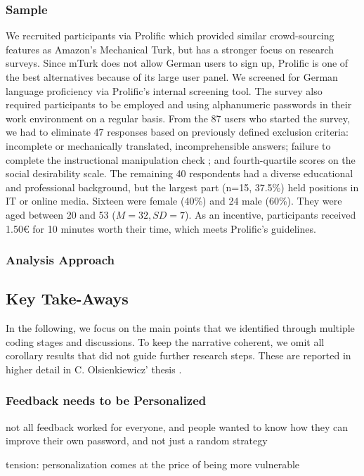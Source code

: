 \subsubsection{Sample}
We recruited participants via Prolific  which provided similar crowd-sourcing features as Amazon's Mechanical Turk, but has a stronger focus on research surveys. Since \gls{mTurk} does not allow German users to sign up, Prolific is one of the best alternatives because of its large user panel. We screened for German language proficiency via Prolific's internal screening tool. The survey also required participants to be employed and using alphanumeric passwords in their work environment on a regular basis. 
From the 87 users who started the survey, we had to eliminate 47 responses based on previously defined exclusion criteria: incomplete or mechanically translated, incomprehensible answers; failure to complete the instructional manipulation check \cite{Oppenheimer2009InstructionalManipulationChecks}; and fourth-quartile scores on the social desirability scale. The remaining 40 respondents had a diverse educational and professional background, but the largest part (n=15, 37.5\%) held positions in IT or online media. Sixteen were female (40\%) and 24 male (60\%). They were aged between 20 and 53 ($M=32, SD=7$). As an incentive, participants received 1.50€ for 10 minutes worth their time, which meets Prolific's guidelines. 

\subsubsection{Analysis Approach}
\subsection{Key Take-Aways}
In the following, we focus on the main points that we identified through multiple coding stages and discussions. To keep the narrative coherent, we omit all corollary results that did not guide further research steps. These are reported in higher detail in C. Olsienkiewicz' thesis \cite{Olsienkiewicz2016BAThesis}. 
\subsubsection{Feedback needs to be Personalized}
not all feedback worked for everyone, and people wanted to know how they can improve their own password, and not just a random strategy

tension: personalization comes at the price of being more vulnerable
